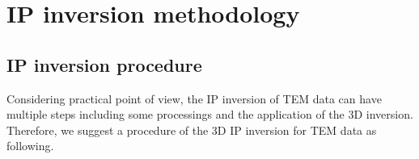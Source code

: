 \documentclass[a4paper, 11pt]{article}
\newcommand{\siginf}{\sigma_\infty}
\newcommand{\peta}{\tilde{\eta}}
\begin{document}
\clearpage


\section{IP inversion methodology}
\subsection{IP inversion procedure}
Considering practical point of view, the IP inversion of TEM data can have multiple steps including some processings and the application of the 3D inversion. Therefore, we suggest a procedure of the 3D IP inversion for TEM data as following.
\end{document}

